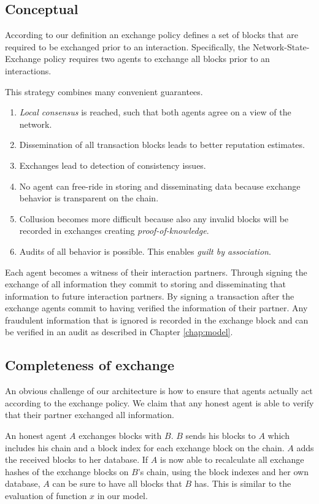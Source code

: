 \subsection{Conceptual}
According to our definition an exchange policy defines a set of blocks that are required
to be exchanged prior to an interaction. Specifically, the
Network-State-Exchange policy requires two agents to exchange all blocks prior to an interactions.

This strategy combines many convenient guarantees. 
\begin{enumerate}
    \item \textit{Local consensus} is reached, such that both agents agree on a view of the network.
    \item Dissemination of all transaction blocks leads to better reputation estimates.
    \item Exchanges lead to detection of consistency issues.
    \item No agent can free-ride in storing and disseminating data because exchange behavior is 
    transparent on the chain.
    \item Collusion becomes more difficult because also any invalid blocks will be recorded in 
    exchanges creating \textit{proof-of-knowledge}.
    \item Audits of all behavior is possible. This enables \textit{guilt by association}.
\end{enumerate}

Each agent becomes a witness of their interaction partners. Through signing the exchange of all 
information they commit to storing and disseminating that information to future interaction partners.
By signing a transaction after the exchange agents commit to having verified the information of their
partner. Any fraudulent information that is ignored is recorded in the exchange block and can be 
verified in an audit as described in Chapter \ref{chap:model}.

\subsection{Completeness of exchange}
An obvious challenge of our architecture is how to ensure that agents actually act according to the
exchange policy. We claim that any honest agent is able to verify that their partner exchanged all 
information.

An honest agent $A$ exchanges blocks with $B$. $B$ sends his blocks to $A$ which includes his chain
and a block index for each exchange block on the chain. 
$A$ adds the received blocks to her database. If $A$ is now able to recalculate all exchange hashes
of the exchange blocks on $B$'s chain, using the block indexes and her own database, $A$ can be 
sure to have all blocks that $B$ has. This is similar to the evaluation of function $x$ in our model.

